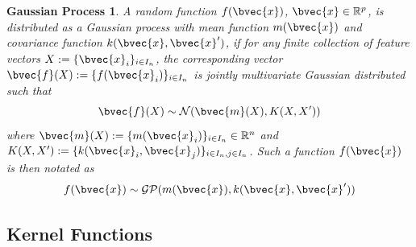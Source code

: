 			\newtheorem{grfdef}{Gaussian Process}[section]
			\begin{grfdef}
				A random function $f(\bvec{x})$, $\bvec{x} \in \mathbb{R}^{p}$, is distributed as a Gaussian process with mean function $m(\bvec{x})$ and covariance function $k(\bvec{x}, \bvec{x}')$, if for any finite collection of feature vectors $X := \{\bvec{x}_{i}\}_{i \in I_{n}}$, the corresponding vector $\bvec{f}(X) := \{f(\bvec{x}_{i})\}_{i \in I_{n}}$ is jointly multivariate Gaussian distributed such that \begin{equation}
						\bvec{f}(X) \sim \mathcal{N}(\bvec{m}(X), K(X, X'))
					\label{Equation:GaussianRandomFieldFiniteDistribution}
					\end{equation} where $\bvec{m}(X) :=  \{m(\bvec{x}_{i})\}_{i \in I_{n}} \in \mathbb{R}^{n}$ and $K(X, X') := \{k(\bvec{x}_{i}, \bvec{x}_{j})\}_{i \in I_{n}, j \in I_{n}}$. Such a function $f(\bvec{x})$ is then notated as \begin{equation}
						f(\bvec{x}) \sim \mathcal{GP}(m(\bvec{x}), k(\bvec{x}, \bvec{x}'))
					\label{Equation:GaussianRandomField}
					\end{equation}	
					
			\label{Definition:GaussianRandomField}
			\end{grfdef}
			
			
			
		\subsection{Kernel Functions}
		\label{Background:GaussianProcesses:KernelFunctions}

